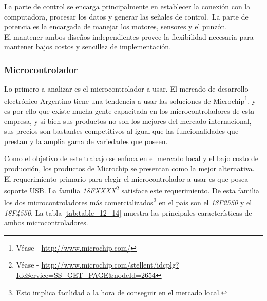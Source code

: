 La parte de control se encarga principalmente en establecer la conexi\'on con
la computadora, procesar los datos y generar las se\~nales de control.\
La parte de potencia es la encargada de manejar los motores, sensores y el
punz\'on.\\

El mantener ambos dise\~nos independientes provee la flexibilidad necesaria
para mantener bajos costos y sencillez de implementaci\'on.





\subsubsection{Microcontrolador}
Lo primero a analizar es el microcontrolador a usar. El mercado de
desarrollo electr\'onico Argentino tiene una tendencia a usar las soluciones de
Microchip\footnote{V\'ease - \url{http://www.microchip.com/}}, y es por ello
que existe mucha gente capacitada en los microcontroladores de esta empresa, y
si bien sus productos no son los mejores del mercado internacional, sus
precios son bastantes competitivos al igual que las funcionalidades que
prestan y la amplia gama de variedades que poseen.\

Como el objetivo de este trabajo se enfoca en el mercado local y el bajo costo
de producci\'on, los productos de Microchip se presentan como la mejor
alternativa.\\

El requerimiento primario para elegir el microcontrolador a usar es que posea
soporte USB. La familia \emph{18FXXXX}\footnote{V\'ease - \url{
http://www.microchip.com/stellent/idcplg?IdcService=SS_GET_PAGE&nodeId=2654}}
satisface este requerimiento. De esta familia los dos microcontroladores m\'as
comercializados\footnote{Esto implica facilidad a la hora de conseguir en el
mercado local.} en el pa\'is son el \emph{18F2550} y el \emph{18F4550}. La
tabla \ref{tab:table_12_14} muestra las principales caracter\'isticas de ambos
microcontroladores.

